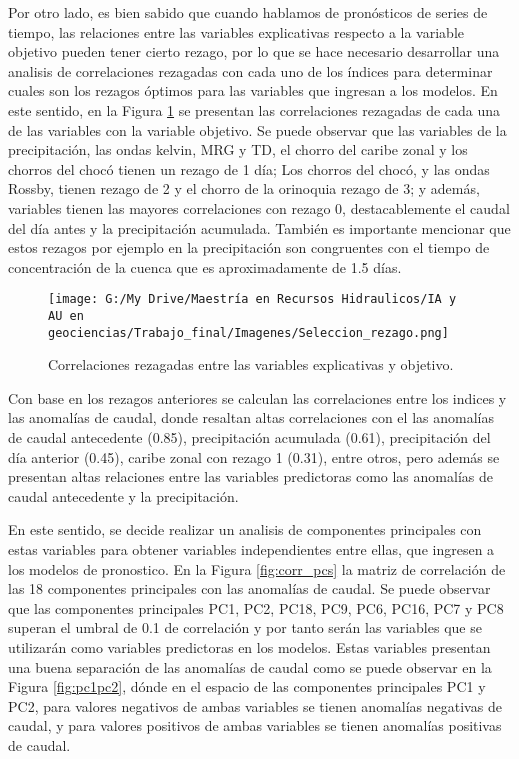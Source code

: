 \documentclass[draft]{agujournal2019}
\begin{document}
Por otro lado, es bien sabido que cuando hablamos de pronósticos de series de tiempo, las relaciones entre las variables explicativas respecto a la variable objetivo pueden tener cierto rezago, por lo que se hace necesario desarrollar una analisis de correlaciones rezagadas con cada uno de los índices para determinar cuales son los rezagos óptimos para las variables que ingresan a los modelos. En este sentido, en la Figura \ref{fig:corr_resa} se presentan las correlaciones rezagadas de cada una de las variables con la variable objetivo. Se puede observar que las variables de la precipitación, las ondas kelvin, MRG y TD,  el chorro del caribe zonal y los chorros del chocó tienen un rezago de 1 día; Los chorros del chocó, y las ondas Rossby, tienen rezago de 2 y el chorro de la orinoquia rezago de 3; y además, variables tienen las mayores correlaciones con rezago 0, destacablemente el caudal del día antes y la precipitación acumulada. También es importante mencionar que estos rezagos por ejemplo en la precipitación son congruentes con el tiempo de concentración de la cuenca que es aproximadamente de 1.5 días.

\begin{figure}[!]
	\centering%
	\texttt{[image: G:/My Drive/Maestría en Recursos Hidraulicos/IA y AU en geociencias/Trabajo\_final/Imagenes/Seleccion\_rezago.png]}
	\caption{Correlaciones rezagadas entre las variables explicativas y objetivo.} \label{fig:corr_resa}
\end{figure}

Con base en los rezagos anteriores se calculan las correlaciones entre los indices y las anomalías de caudal, donde resaltan altas correlaciones con el las anomalías de caudal antecedente (0.85), precipitación acumulada (0.61), precipitación del día anterior (0.45), caribe zonal con rezago 1 (0.31), entre otros, pero además se presentan altas relaciones entre las variables predictoras como las anomalías de caudal antecedente y la precipitación.  

En este sentido, se decide realizar un analisis de componentes principales con estas variables para obtener variables independientes entre ellas, que ingresen a los modelos de pronostico. En la Figura \ref{fig:corr_pcs} la matriz de correlación de las 18 componentes principales con las anomalías de caudal. Se puede observar que las componentes principales PC1, PC2, PC18, PC9, PC6, PC16, PC7 y PC8 superan el umbral de 0.1 de correlación y por tanto serán las variables que se utilizarán como variables predictoras en los modelos. Estas variables presentan una buena separación de las anomalías de caudal como se puede observar en la Figura \ref{fig:pc1pc2}, dónde en el espacio de las componentes principales PC1 y PC2, para valores negativos de ambas variables se tienen anomalías negativas de caudal, y para valores positivos de ambas variables se tienen anomalías positivas de caudal.
\end{document}
